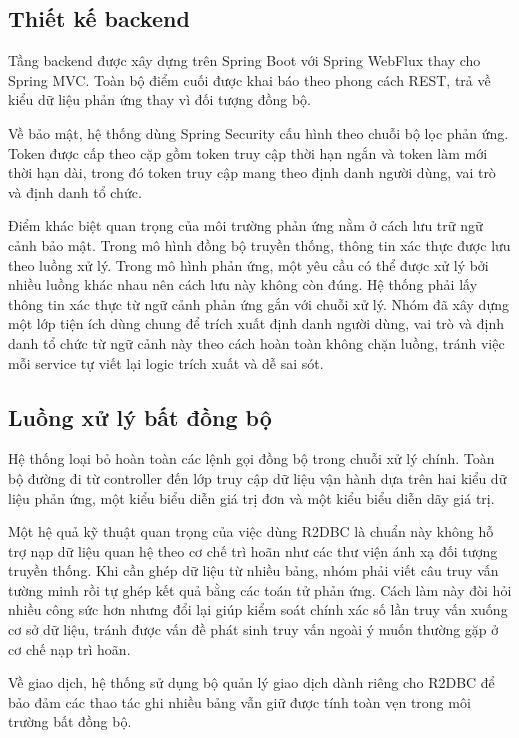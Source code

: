 \documentclass[12pt,a4paper,oneside]{report}
\begin{document}
\subsection{Thiết kế backend}

Tầng backend được xây dựng trên Spring Boot với Spring WebFlux thay cho Spring MVC. Toàn bộ điểm cuối được khai báo theo phong cách REST, trả về kiểu dữ liệu phản ứng thay vì đối tượng đồng bộ.

Về bảo mật, hệ thống dùng Spring Security cấu hình theo chuỗi bộ lọc phản ứng. Token được cấp theo cặp gồm token truy cập thời hạn ngắn và token làm mới thời hạn dài, trong đó token truy cập mang theo định danh người dùng, vai trò và định danh tổ chức.

Điểm khác biệt quan trọng của môi trường phản ứng nằm ở cách lưu trữ ngữ cảnh bảo mật. Trong mô hình đồng bộ truyền thống, thông tin xác thực được lưu theo luồng xử lý. Trong mô hình phản ứng, một yêu cầu có thể được xử lý bởi nhiều luồng khác nhau nên cách lưu này không còn đúng. Hệ thống phải lấy thông tin xác thực từ ngữ cảnh phản ứng gắn với chuỗi xử lý. Nhóm đã xây dựng một lớp tiện ích dùng chung để trích xuất định danh người dùng, vai trò và định danh tổ chức từ ngữ cảnh này theo cách hoàn toàn không chặn luồng, tránh việc mỗi service tự viết lại logic trích xuất và dễ sai sót.

\subsection{Luồng xử lý bất đồng bộ}

Hệ thống loại bỏ hoàn toàn các lệnh gọi đồng bộ trong chuỗi xử lý chính. Toàn bộ đường đi từ controller đến lớp truy cập dữ liệu vận hành dựa trên hai kiểu dữ liệu phản ứng, một kiểu biểu diễn giá trị đơn và một kiểu biểu diễn dãy giá trị.

Một hệ quả kỹ thuật quan trọng của việc dùng R2DBC là chuẩn này không hỗ trợ nạp dữ liệu quan hệ theo cơ chế trì hoãn như các thư viện ánh xạ đối tượng truyền thống. Khi cần ghép dữ liệu từ nhiều bảng, nhóm phải viết câu truy vấn tường minh rồi tự ghép kết quả bằng các toán tử phản ứng. Cách làm này đòi hỏi nhiều công sức hơn nhưng đổi lại giúp kiểm soát chính xác số lần truy vấn xuống cơ sở dữ liệu, tránh được vấn đề phát sinh truy vấn ngoài ý muốn thường gặp ở cơ chế nạp trì hoãn.

Về giao dịch, hệ thống sử dụng bộ quản lý giao dịch dành riêng cho R2DBC để bảo đảm các thao tác ghi nhiều bảng vẫn giữ được tính toàn vẹn trong môi trường bất đồng bộ.
\end{document}
